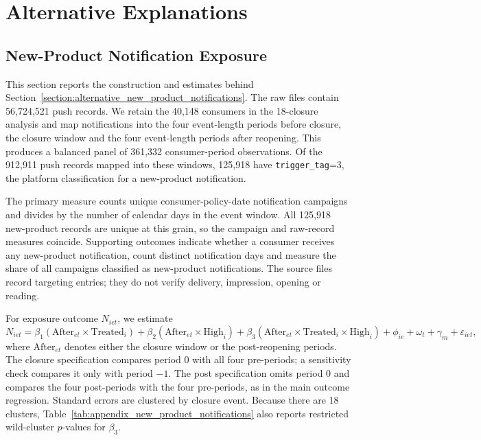 \documentclass[11 pt]{article}
\begin{document}
\section{Alternative Explanations}
\label{app:alternative_explanations}
\subsection{New-Product Notification Exposure}
\label{app:new_product_notifications}

This section reports the construction and estimates behind Section~\ref{section:alternative_new_product_notifications}. The raw files contain 56,724,521 push records. We retain the 40,148 consumers in the 18-closure analysis and map notifications into the four event-length periods before closure, the closure window and the four event-length periods after reopening. This produces a balanced panel of 361,332 consumer-period observations. Of the 912,911 push records mapped into these windows, 125,918 have \texttt{trigger\_tag}=3, the platform classification for a new-product notification.

The primary measure counts unique consumer-policy-date notification campaigns and divides by the number of calendar days in the event window. All 125,918 new-product records are unique at this grain, so the campaign and raw-record measures coincide. Supporting outcomes indicate whether a consumer receives any new-product notification, count distinct notification days and measure the share of all campaigns classified as new-product notifications. The source files record targeting entries; they do not verify delivery, impression, opening or reading.

For exposure outcome $N_{iet}$, we estimate
\begin{equation}
	N_{iet}=\beta_1(\text{After}_{et}\times\text{Treated}_{i})
	+\beta_2(\text{After}_{et}\times\text{High}_{i})
	+\beta_3(\text{After}_{et}\times\text{Treated}_{i}\times\text{High}_{i})
	+\phi_{ie}+\omega_t+\gamma_m+\varepsilon_{iet},
	\label{eq:new_product_notification_ddd}
\end{equation}
where $\text{After}_{et}$ denotes either the closure window or the post-reopening periods. The closure specification compares period 0 with all four pre-periods; a sensitivity check compares it only with period $-1$. The post specification omits period 0 and compares the four post-periods with the four pre-periods, as in the main outcome regression. Standard errors are clustered by closure event. Because there are 18 clusters, Table~\ref{tab:appendix_new_product_notifications} also reports restricted wild-cluster $p$-values for $\beta_3$.
\end{document}
